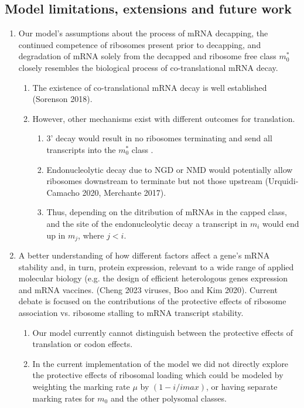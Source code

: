 \documentclass[review]{elsarticle}
\begin{document}
\begin{enumerate}
\subsection{Model limitations, extensions and future work}
\begin{enumerate}
\item Our model's assumptions about the process of mRNA decapping, the continued competence of ribosomes present prior to decapping, and degradation of mRNA solely from the decapped and ribosome free class $m_0^*$  closely resembles the biological process of co-translational mRNA decay.
  \begin{enumerate}
  \item   The existence of co-translational mRNA decay is well established (Sorenson 2018).
  \item However, other mechanisms exist with different outcomes for translation. 
    \begin{enumerate}
    \item 3' decay would result in no ribosomes terminating and send all transcripts into the $m_0^*$ class . 
    \item Endonucleolytic decay due to NGD or NMD would potentially allow ribosomes downstream to terminate but not those upstream (Urquidi-Camacho 2020, Merchante 2017).
    \item Thus, depending on the ditribution of mRNAs in the capped class, and the site of the endonucleolytic decay a transcript in $m_i$ would end up in $m_{j}$, where $j < i$.		
    \end{enumerate}
  \end{enumerate}
\item  A better understanding of how different factors affect a gene's mRNA stability and, in turn, protein expression, relevant to a wide range of applied molecular biology (e.g. the design of efficient heterologous genes expression and mRNA vaccines. (Cheng 2023 viruses, Boo and Kim 2020).
  Current debate is focused on the contributions of the protective effects of ribosome association vs. ribosome stalling to mRNA transcript stability.
  \begin{enumerate}
  \item Our model currently cannot distinguish between the protective effects of translation or codon effects.
  \item In the current implementation of the model we did not directly explore the protective effects of ribosomal loading which could be modeled by weighting the marking rate $\mu $ by $(1-i/imax)$, or having separate marking rates for $m_0$ and the other polysomal classes.

\end{enumerate}
\end{enumerate}
\end{enumerate}
\end{document}
